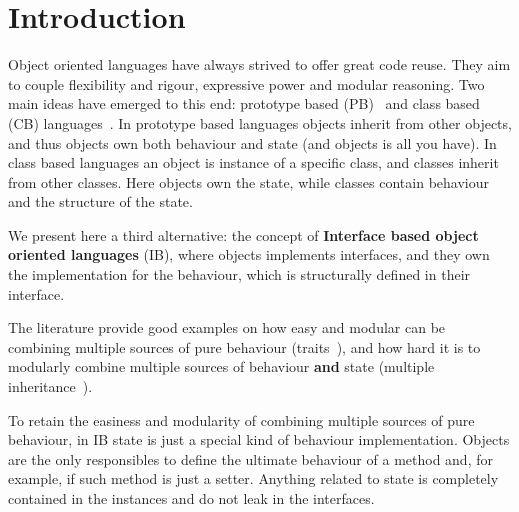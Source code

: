 \section{Introduction}\label{sec:intro}



Object oriented languages have always strived to offer great code reuse.
They aim to couple flexibility and rigour, expressive power and
modular reasoning.  Two main ideas have emerged to this end: prototype
based (PB)~\cite{} and class based (CB) languages~\cite{}.  In prototype based
languages objects inherit from other objects, and thus objects own
both behaviour and state (and objects is all you have).
In class based languages an object is instance of a specific class,
and classes inherit from other classes.  Here objects own the state,
while classes contain behaviour and the structure of the state.

We present here a third alternative: the concept of \textbf{Interface
  based object oriented languages} (IB), where objects implements
interfaces, and they own the implementation for the behaviour, which
is structurally defined in their interface.
  
The literature provide good examples on how easy and modular can be
combining multiple sources of pure behaviour (traits~\cite{}), and how hard
it is to modularly combine multiple sources of behaviour \textbf{and}
state (multiple inheritance~\cite{}).

To retain the easiness and modularity of combining multiple sources of
pure behaviour, in IB state is just a special kind of behaviour
implementation. Objects are the only responsibles to define the
ultimate behaviour of a method and, for example, if such method is
just a setter. Anything related to state is completely contained in
the instances and do not leak in the interfaces.


